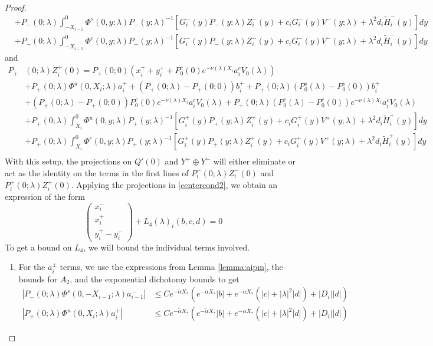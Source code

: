 \documentclass[thesis.tex]{subfiles}
\begin{document}
\begin{lemma}
\begin{proof}
\begin{align*}
&+ P_-(0; \lambda) \int_{-X_{i-1}}^0 \Phi^s(0, y; \lambda) P_-(y; \lambda)^{-1} [ G_i^-(y) P_-(y; \lambda) Z_i^-(y) + c_i G_i^-(y) V^-(y; \lambda) + \lambda^2 d_i \tilde{H}_i^-(y)] dy \\
&+ P_-(0; \lambda) \int_{-X_{i-1}}^0 \Phi^c(0, y; \lambda) P_-(y; \lambda)^{-1} [ G_i^-(y) P_-(y; \lambda) Z_i^-(y) + c_i G_i^-(y) V^-(y; \lambda) + \lambda^2 d_i \tilde{H}_i^-(y)] dy 
\end{align*}
and
\begin{align*}
P_+&(0; \lambda) Z_i^+(0) = P_+(0; 0)( x_i^+ + y_i^+ + P_0^c(0) e^{-\nu(\lambda)X_i} a_i^c V_0(\lambda) )\\
&+ P_+(0; \lambda) \Phi^u(0, X_i; \lambda) a_i^+ + (P_+(0; \lambda) - P_+(0; 0)) b_i^+ + P_+(0; \lambda) (P_0^s(\lambda) - P_0^s(0)) b_i^+ \\
&+ (P_+(0; \lambda) - P_+(0; 0))P_0^c(0) e^{-\nu(\lambda)X_i} a_i^c V_0(\lambda) + P_+(0; \lambda) (P_0^c(\lambda) - P_0^c(0)) e^{-\nu(\lambda)X_i} a_i^c V_0(\lambda) \\
&+ P_+(0; \lambda) \int_{X_i}^0 \Phi^u(0, y; \lambda) P_+(y; \lambda)^{-1}[ G_i^+(y) P_+(y; \lambda) Z_i^+(y) + c_i G_i^+(y) V^+(y; \lambda) + \lambda^2 d_i \tilde{H}_i^+(y)] dy \\
&+ P_+(0; \lambda) \int_{X_i}^0 \Phi^c(0, y; \lambda) P_+(y; \lambda)^{-1}[ G_i^+(y) P_+(y; \lambda) Z_i^+(y) + c_i G_i^+(y) V^+(y; \lambda) + \lambda^2 d_i \tilde{H}_i^+(y)] dy \\
\end{align*}
With this setup, the projections on $Q'(0)$ and $Y^+ \oplus Y^-$ will either eliminate or act as the identity on the terms in the first lines of $P_i^-(0; \lambda) Z_i^-(0)$ and $P_i^+(0; \lambda) Z_i^+(0)$. Applying the projections in \eqref{centercond2}, we obtain an expression of the form
\begin{equation}\label{projxy}
\begin{pmatrix}x_i^- \\ x_i^+ \\ 
y_i^+ - y_i^- \end{pmatrix} + L_4(\lambda)_i(b, c, d) = 0
\end{equation}
To get a bound on $L_4$, we will bound the individual terms involved. 

\begin{enumerate}
\item For the $a_i^\pm$ terms, we use the expressions from Lemma \ref{lemma:aipm}, the bounds for $A_2$, and the exponential dichotomy bounds to get
\begin{align*}
|P_-(0; \lambda) \Phi^s(0, -X_{i-1}; \lambda) a_{i-1}^-| 
&\leq C e^{-\tilde{\alpha} X_*} \left( e^{-\tilde{\alpha} X_*} |b|  + e^{-\alpha X_*}(|c| + |\lambda|^2 |d|) + |D_i||d| \right)\\
|P_+(0; \lambda) \Phi^u(0, X_i; \lambda) a_i^+| 
&\leq C e^{-\tilde{\alpha} X_*} \left( e^{-\tilde{\alpha} X_*} |b|  + e^{-\alpha X_*}(|c| + |\lambda|^2 |d|) + |D_i||d| \right)
\end{align*}


\end{enumerate}
\end{proof}
\end{lemma}
\end{document}

